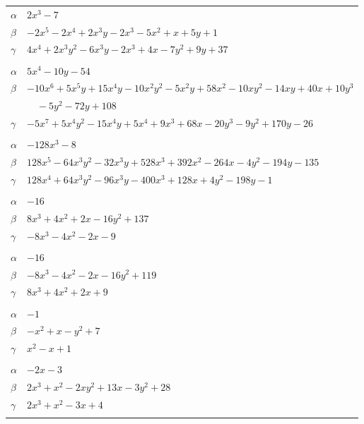 \documentclass[11pt]{article}
\begin{document}
\begin{longtable}{@{}ll@{}}
$\alpha$ & $2x^{3}-7$\\
$\beta$ & $-2x^{5}-2x^{4}+2x^{3}y-2x^{3}-5x^{2}+x+5y+1$\\
$\gamma$ & $4x^{4}+2x^{3}y^{2}-6x^{3}y-2x^{3}+4x-7y^{2}+9y+37$\\
\addlinespace[3pt]
\multicolumn{2}{@{}l}{$\{i,j\}=\{0,15\}$, $k_{ij}=2$}\\
$\alpha$ & $5x^{4}-10y-54$\\
$\beta$ & $-10x^{6}+5x^{5}y+15x^{4}y-10x^{2}y^{2}-5x^{2}y+58x^{2}-10xy^{2}-14xy+40x+10y^{3}$\\
 & $\quad -5y^{2}-72y+108$\\
$\gamma$ & $-5x^{7}+5x^{4}y^{2}-15x^{4}y+5x^{4}+9x^{3}+68x-20y^{3}-9y^{2}+170y-26$\\
\addlinespace[3pt]
\multicolumn{2}{@{}l}{$\{i,j\}=\{0,26\}$, $k_{ij}=3^{2}$}\\
$\alpha$ & $-128x^{3}-8$\\
$\beta$ & $128x^{5}-64x^{3}y^{2}-32x^{3}y+528x^{3}+392x^{2}-264x-4y^{2}-194y-135$\\
$\gamma$ & $128x^{4}+64x^{3}y^{2}-96x^{3}y-400x^{3}+128x+4y^{2}-198y-1$\\
\addlinespace[3pt]
\multicolumn{2}{@{}l}{$\{i,j\}=\{1,13\}$, $k_{ij}=7$}\\
$\alpha$ & $-16$\\
$\beta$ & $8x^{3}+4x^{2}+2x-16y^{2}+137$\\
$\gamma$ & $-8x^{3}-4x^{2}-2x-9$\\
\addlinespace[3pt]
\multicolumn{2}{@{}l}{$\{i,j\}=\{1,18\}$, $k_{ij}=7$}\\
$\alpha$ & $-16$\\
$\beta$ & $-8x^{3}-4x^{2}-2x-16y^{2}+119$\\
$\gamma$ & $8x^{3}+4x^{2}+2x+9$\\
\addlinespace[3pt]
\multicolumn{2}{@{}l}{$\{i,j\}=\{1,25\}$, $k_{ij}=1$}\\
$\alpha$ & $-1$\\
$\beta$ & $-x^{2}+x-y^{2}+7$\\
$\gamma$ & $x^{2}-x+1$\\
\addlinespace[3pt]
\multicolumn{2}{@{}l}{$\{i,j\}=\{1,27\}$, $k_{ij}=7$}\\
$\alpha$ & $-2x-3$\\
$\beta$ & $2x^{3}+x^{2}-2xy^{2}+13x-3y^{2}+28$\\
$\gamma$ & $2x^{3}+x^{2}-3x+4$\\
\addlinespace[3pt]
\multicolumn{2}{@{}l}{$\{i,j\}=\{1,29\}$, $k_{ij}=2\cdot 7$}\\

\end{longtable}
\end{document}
